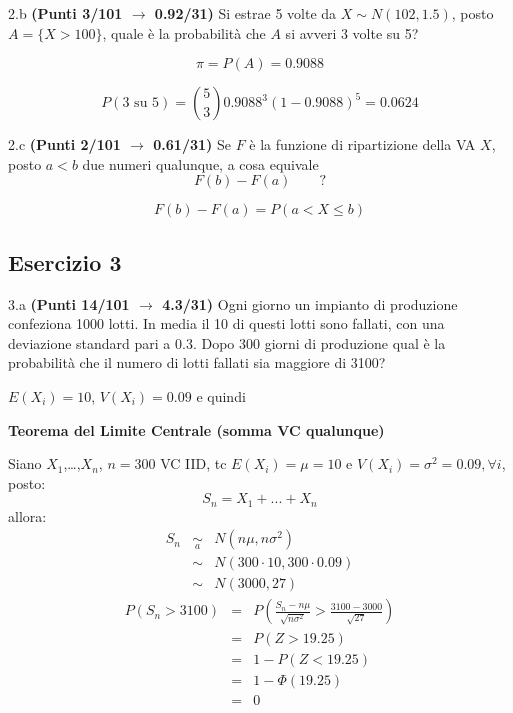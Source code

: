 \documentclass[
  11pt,
]{book}
\theoremstyle{mytheoremstyle}
\theoremstyle{mydefstyle}
\newenvironment{sol}
  {
  \begin{tcolorbox}[enhanced,breakable,arc=0.1mm,boxrule=1pt,colback=white,colframe=iblue,
  title=\bf \fontfamily{lmss}\selectfont \hspace{.5 cm} Soluzione,drop fuzzy shadow]

}{
\end{tcolorbox}
  }
\begin{document}
2.b \textbf{(Punti 3/101 \(\rightarrow\) 0.92/31)} Si estrae 5 volte da \(X\sim N(102,1.5)\), posto \(A=\{X>100\}\), quale è la probabilità che \(A\) si avveri 3 volte su 5?

\begin{sol}
\[
\pi=P(A)=0.9088
\]

\[
P(3\text{ su }5)=\binom{5}{3}0.9088^3(1-0.9088)^5=0.0624
\]

\end{sol}

2.c \textbf{(Punti 2/101 \(\rightarrow\) 0.61/31)} Se \(F\) è la funzione di ripartizione della VA \(X\), posto \(a < b\) due numeri qualunque, a cosa equivale
\[
F(b)-F(a) \qquad?
\]

\begin{sol}
\[
F(b)-F(a) = P(a<X\le b)
\]

\end{sol}

\subsection{Esercizio 3}\label{esercizio-3-10}

3.a \textbf{(Punti 14/101 \(\rightarrow\) 4.3/31)} Ogni giorno un impianto di produzione confeziona 1000 lotti. In media il 10 di questi lotti sono fallati, con una deviazione standard pari a 0.3. Dopo 300 giorni di produzione qual è la probabilità che il numero di lotti fallati sia maggiore di 3100?

\begin{sol}
\(E(X_i)=10\), \(V(X_i)=0.09\) e quindi

\textbf{Teorema del Limite Centrale (somma VC qualunque)}

Siano \(X_1\),\ldots,\(X_n\), \(n=300\) VC IID, tc \(E(X_i)=\mu=10\) e \(V(X_i)=\sigma^2=0.09,\forall i\), posto:
\[
      S_n = X_1 + ... + X_n
      \]
allora:\begin{eqnarray*}
  S_n & \mathop{\sim}\limits_{a}& N(n\mu,n\sigma^2) \\
     &\sim & N(300\cdot10,300\cdot0.09) \\
     &\sim & N(3000,27) 
  \end{eqnarray*}\begin{eqnarray*}
      P( S_n   >   3100 ) 
        &=& P\left(  \frac { S_n  -  n\mu }{ \sqrt{n\sigma^2} }  >  \frac { 3100  -  3000 }{\sqrt{ 27 }} \right)  \\
                 &=& P\left(  Z   >   19.25 \right) \\    &=& 1-P(Z< 19.25 )\\ 
                 &=&  1-\Phi( 19.25 ) \\ &=&  0 
      \end{eqnarray*}

\end{sol}
\end{document}
